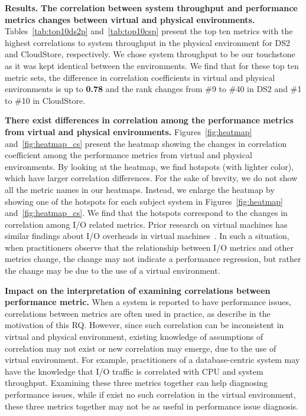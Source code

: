 \documentclass[smallextended]{svjour3}       %
\begin{document}
\noindent \textbf{Results.}
\noindent \textbf{The correlation between system throughput and performance metrics changes between virtual and physical environments.} Tables~\ref{tab:top10ds2p} and~\ref{tab:top10csp} present the top ten metrics with the highest correlations to system throughput in the physical environment for DS2 and CloudStore, respectively. We chose system throughput to be our touchstone as it was kept identical between the environments.  We find that for these top ten metric sets, the difference in correlation coefficients in virtual and physical environments is up to \textbf{0.78} and the rank changes from \#9 to \#40 in DS2 and \#1 to \#10 in CloudStore.

\noindent \textbf{There exist differences in correlation among the performance metrics from virtual and physical environments.} Figures~\ref{fig:heatmap} and~\ref{fig:heatmap_cs} present the heatmap showing the changes in correlation coefficient among the performance metrics from virtual and physical environments. By looking at the heatmap, we find hotspots (with lighter color), which have larger correlation differences. For the sake of brevity, we do not show all the metric names in our heatmaps. Instead, we enlarge the heatmap by showing one of the hotspots for each subject system in Figures~\ref{fig:heatmap} and~\ref{fig:heatmap_cs}. We find that the hotspots correspond to the changes in correlation among I/O related metrics. Prior research on virtual machines has similar findings about I/O overheads in virtual machines~\cite{menon2005diagnosing,kraft2011io}. In such a situation, when practitioners observe that the relationship between I/O metrics and other metrics change, the change may not indicate a performance regression, but rather the change may be due to the use of a virtual environment.

\textbf{Impact on the interpretation of examining correlations between performance metric.} When a system is reported to have performance issues, correlations between metrics are often used in practice, as describe in the motivation of this RQ. However, since such correlation can be inconsistent in virtual and physical environment, existing knowledge of assumptions of correlation may not exist or new correlation may emerge, due to the use of virtual environment. For example, practitioners of a database-centric system may have the knowledge that I/O traffic is correlated with CPU and system throughput. Examining these three metrics together can help diagnosing performance issues, while if exist no such correlation in the virtual environment, these three metrics together may not be as useful in performance issue diagnosis.
\end{document}
